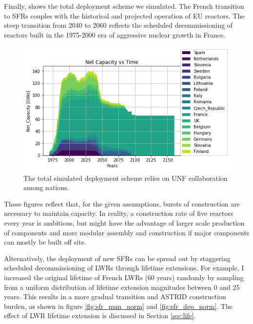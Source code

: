 Finally,  shows the total deployment scheme we simulated.  
The French transition to \glspl{SFR} couples with the historical and projected 
operation of \gls{EU} reactors.  The steep transition from 2040 to 2060 
reflects the scheduled decommissioning of reactors built in the 1975-2000 era 
of aggressive nuclear growth in France.

\begin{figure}[htbp!]
    \begin{center}
        \includegraphics[scale=0.7]{./images/eu_future/onesim.png}
    \end{center}
    \caption{The total simulated deployment scheme relies on \gls{UNF} 
    collaboration among nations.} 
    \label{fig:tot_dep}
\end{figure}

These figures reflect that, for the given assumptions, bursts of construction
are necessary to maintain capacity.  In reality, a construction rate of five 
reactors every year is ambitious, but might have the advantage of
larger scale production of components and more modular assembly and construction if major components can mostly be built off site.


Alternatively, the 
deployment of new \glspl{SFR} can be spread out by staggering scheduled 
decommissioning of \glspl{LWR} through lifetime extensions. For example,
I increased the original lifetime of French \glspl{LWR} (60 years) randomly 
by sampling from a uniform distribution of lifetime extension
magnitudes between 0 and 25 years. 
This results in a more gradual transition and \gls{ASTRID} construction
burden, as shown in figure \ref{fig:sfr_num_norm} and \ref{fig:sfr_dep_norm}.
The effect of \gls{LWR} lifetime extension is discussed in Section \ref{sec:life}.

